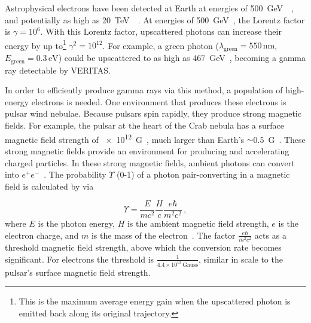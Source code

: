   
  Astrophysical electrons have been detected at Earth at energies of \SI{500}{\GeV{}}~\cite{500GeVElectrons,fermi_electron}, and potentially as high as \SI{20}{\TeV{}}~\cite{hess2017_electronspectrum}.
  At energies of \SI{500}{\GeV{}}, the Lorentz factor is $\gamma = 10^6$.
  With this Lorentz factor, upscattered photons can increase their energy by up to\footnote{This is the maximum average energy gain when the upscattered photon is emitted back along its original trajectory.} $\gamma^{2} = 10^{12}$.
  For example, a green photon ($\lambda_{\textrm{green}}=550\,\textrm{nm}$, $E_{\textrm{green}}=0.3\,\textrm{eV}$) could be upscattered to as high as \SI{467}{\GeV{}}, becoming a gamma ray detectable by VERITAS.
  
  In order to efficiently produce gamma rays via this method, a population of high-energy electrons is needed.
  One environment that produces these electrons is pulsar wind nebulae.
  Because pulsars spin rapidly, they produce strong magnetic fields.
  For example, the pulsar at the heart of the Crab nebula has a surface magnetic field strength of \SI{e12}{G}~\cite{pwn_evolution}, much larger than Earth's $\sim$\SI{0.5}{G}~\cite{earth_geomag}.
  These strong magnetic fields provide an environment for producing and accelerating charged particles.
  In these strong magnetic fields, ambient photons can convert into $e^{+}e^{-}$~\cite{pwn_pairprod2,pwn_pairprod3}.
  The probability $\Upsilon$ (0-1) of a photon pair-converting in a magnetic field is calculated by via 
  
  \begin{equation}\label{eqn:pwn_pairprod}
    \Upsilon = \frac{E}{mc^2} \frac{H}{c} \frac{e \hbar}{m^2c^2} \,,
  \end{equation}
  where $E$ is the photon energy, $H$ is the ambient magnetic field strength, $e$ is the electron charge, and $m$ is the mass of the electron~\cite{pwn_pairprod3}.
  The factor $\frac{e \hbar}{m^2c^2}$ acts as a threshold magnetic field strength, above which the conversion rate becomes significant.
  For electrons the threshold is $\frac{1}{4.4\times10^{13}\,\textrm{Gauss}}$, similar in scale to the pulsar's surface magnetic field strength.
  
